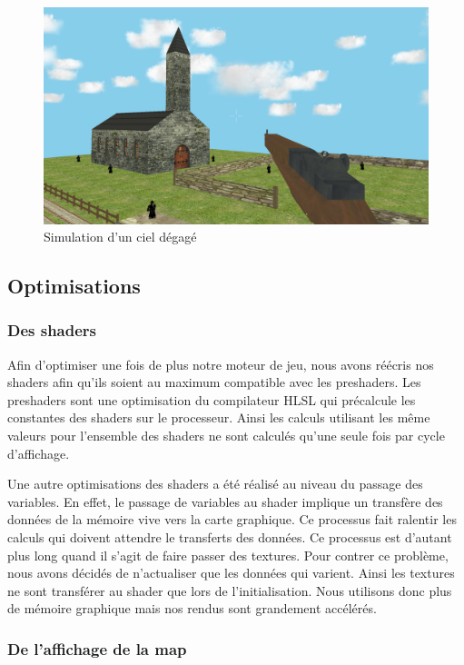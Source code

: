 \documentclass[11pt]{report}
\begin{document}
\begin{figure}[htbp]
\centering
\includegraphics[scale=0.13]{ciel_claire.png}
\caption{Simulation d'un ciel dégagé}
\end{figure}

\subsection{Optimisations}

\subsubsection{Des shaders}

Afin d’optimiser une fois de plus notre moteur de jeu, nous avons réécris nos shaders afin qu’ils soient au maximum compatible avec les preshaders. Les preshaders sont une optimisation du compilateur HLSL qui précalcule les constantes des shaders sur le processeur. Ainsi les calculs utilisant les même valeurs pour l’ensemble des shaders ne sont calculés qu’une seule fois par cycle d'affichage.

Une autre optimisations des shaders a été réalisé au niveau du passage des variables. En effet, le passage de variables au shader implique un transfère des données de la mémoire vive vers la carte graphique. Ce processus fait ralentir les calculs qui doivent attendre le transferts des données. Ce processus est d’autant plus long quand il s’agit de faire passer des textures. Pour contrer ce problème, nous avons décidés de n’actualiser que les données qui varient. Ainsi les textures ne sont transférer au shader que lors de l’initialisation. Nous utilisons donc plus de mémoire graphique mais nos rendus sont grandement accélérés.

\subsubsection{De l'affichage de la map}
\end{document}
